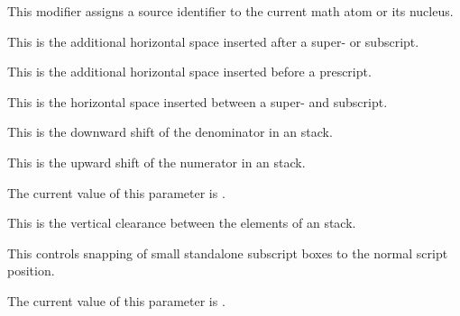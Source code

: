 \stopnewprimitive

\startnewprimitive[title={\prm {Umathsource}}]

This modifier assigns a source identifier to the current math atom or its
nucleus.

\stopnewprimitive

\startnewprimitive[title={\prm {Umathspaceafterscript}}]

This is the additional horizontal space inserted after a super- or subscript.

\stopnewprimitive

\startnewprimitive[title={\prm {Umathspacebeforescript}}]

This is the additional horizontal space inserted before a prescript.

\stopnewprimitive

\startnewprimitive[title={\prm {Umathspacebetweenscript}}]

This is the horizontal space inserted between a super- and subscript.

\stopnewprimitive

\startnewprimitive[title={\prm {Umathstackdenomdown}}]

This is the downward shift of the denominator in an  stack.

\stopnewprimitive

\startnewprimitive[title={\prm {Umathstacknumup}}]

This is the upward shift of the numerator in an  stack.

\stopnewprimitive

\startnewprimitive[title={\prm {Umathstackvariant}}]

The current value of this parameter is \CurrentMathVariant \Umathstackvariant.

\stopnewprimitive

\startnewprimitive[title={\prm {Umathstackvgap}}]

This is the vertical clearance between the elements of an  stack.

\stopnewprimitive

\startnewprimitive[title={\prm {Umathsubscriptsnap}}]

This controls snapping of small standalone subscript boxes to the normal script
position.

\stopnewprimitive

\startnewprimitive[title={\prm {Umathsubscriptvariant}}]

The current value of this parameter is \CurrentMathVariant
\Umathsubscriptvariant.

